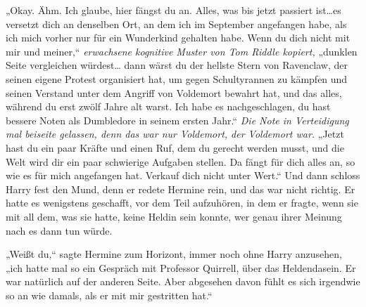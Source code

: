 „Okay. Ähm. Ich glaube, hier fängst du an. Alles, was bis jetzt passiert ist…es versetzt dich an denselben Ort, an dem ich im September angefangen habe, als ich mich vorher nur für ein Wunderkind gehalten habe. Wenn du dich nicht mit mir und meiner,“ \emph{erwachsene kognitive Muster von Tom Riddle kopiert,} „dunklen Seite vergleichen würdest… dann wärst du der hellste Stern von Ravenclaw, der seinen eigene Protest organisiert hat, um gegen Schultyrannen zu kämpfen und seinen Verstand unter dem Angriff von Voldemort bewahrt hat, und das alles, während du erst zwölf Jahre alt warst. Ich habe es nachgeschlagen, du hast bessere Noten als Dumbledore in seinem ersten Jahr.“ \emph{Die Note in Verteidigung mal beiseite gelassen, denn das war nur Voldemort, der Voldemort war.} „Jetzt hast du ein paar Kräfte und einen Ruf, dem du gerecht werden musst, und die Welt wird dir ein paar schwierige Aufgaben stellen. Da fängt für dich alles an, so wie es für mich angefangen hat. Verkauf dich nicht unter Wert.“ Und dann schloss Harry fest den Mund, denn er redete Hermine rein, und das war nicht richtig.
Er hatte es wenigstens geschafft, vor dem Teil aufzuhören, in dem er fragte, wenn sie mit all dem, was sie hatte, keine Heldin sein konnte, wer genau ihrer Meinung nach es dann tun würde.

„Weißt du,“ sagte Hermine zum Horizont, immer noch ohne Harry anzusehen, „ich hatte mal so ein Gespräch mit Professor Quirrell, über das Heldendasein. Er war natürlich auf der anderen Seite. Aber abgesehen davon fühlt es sich irgendwie so an wie damals, als er mit mir gestritten hat.“

